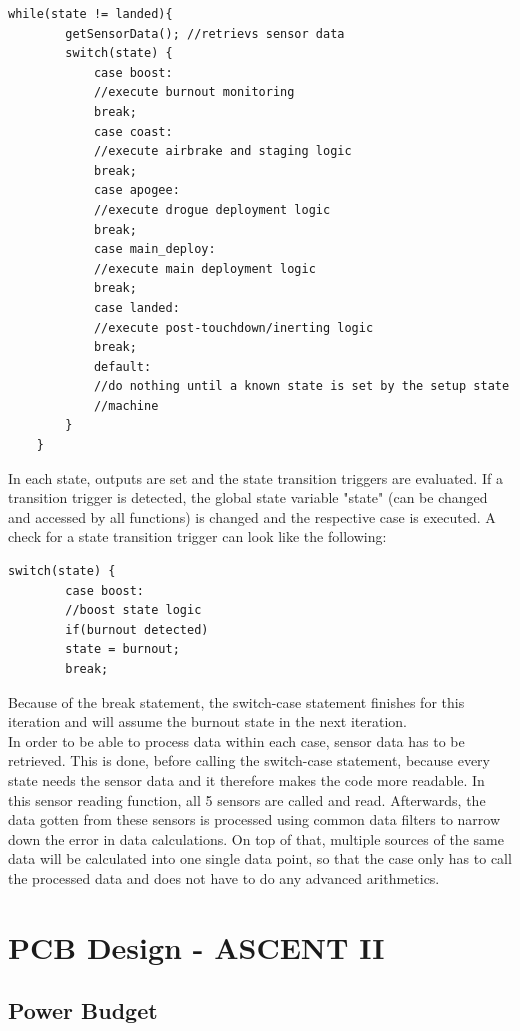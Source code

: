 \documentclass[fontsize=11pt,%
twoside,%
BCOR          = 8mm, %
DIV           = 11,  %
titlepage     = off,%
index=totoc,%
xcolor        = pdftex,%
dvipsnames,%
bibliography  = totoc,%
bibliography = numbered, %
listof        = notnumbered]{scrreprt}
\begin{document}
\begin{lstlisting}[caption={Flight state machine}, label={code:state_machine}]
	while(state != landed){
		getSensorData(); //retrievs sensor data
		switch(state) {
			case boost:
			//execute burnout monitoring
			break;
			case coast:
			//execute airbrake and staging logic
			break;
			case apogee:
			//execute drogue deployment logic
			break;
			case main_deploy:
			//execute main deployment logic
			break;
			case landed:
			//execute post-touchdown/inerting logic
			break;
			default:
			//do nothing until a known state is set by the setup state 
			//machine
		}
	}
\end{lstlisting}

In each state, outputs are set and the state transition triggers are evaluated. If a transition trigger is detected, the global state variable "state" (can be changed and accessed by all functions) is changed and the respective case is executed. A check for a state transition trigger can look like the following:

\begin{lstlisting}[caption={State transition logic}, label={code:state_transition}]
	switch(state) {
		case boost:
		//boost state logic
		if(burnout detected)
		state = burnout;
		break;
	\end{lstlisting}
	
	Because of the break statement, the switch-case statement finishes for this iteration and will assume the burnout state in the next iteration.\\
	In order to be able to process data within each case, sensor data has to be retrieved. This is done, before calling the switch-case statement, because every state needs the sensor data and it therefore makes the code more readable. In this sensor reading function, all 5 sensors are called and read. Afterwards, the data gotten from these sensors is processed using common data filters to narrow down the error in data calculations. On top of that, multiple sources of the same data will be calculated into one single data point, so that the case only has to call the processed data and does not have to do any advanced arithmetics.



\chapter{PCB Design - ASCENT II}

\section{Power Budget}
\end{document}
